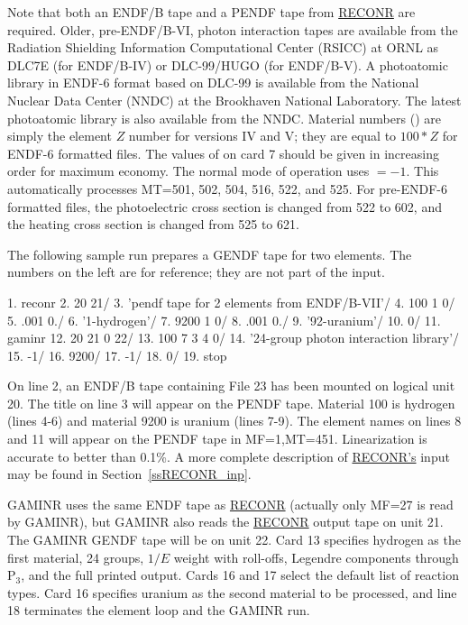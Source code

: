 Note that both an ENDF/B tape and a PENDF tape from
\hyperlink{sRECONRhy}{RECONR} are required.
Older, pre-ENDF/B-VI, photon interaction tapes are available from the Radiation
Shielding Information Computational Center (RSICC) at ORNL
as DLC7E (for ENDF/B-IV) or DLC-99/HUGO (for ENDF/B-V).
A photoatomic library in ENDF-6 format based on DLC-99 is available
from the National Nuclear Data Center (NNDC) at the Brookhaven National
Laboratory.  The latest photoatomic library is also available
from the NNDC.  Material numbers () are simply the element
$Z$ number for versions IV and V;  they are equal to $100{*}Z$ for
ENDF-6 formatted files.  The values of  on card 7 should
be given in increasing order for maximum economy.  The normal mode
of operation uses $=-1$.  This automatically processes
MT=501, 502, 504, 516, 522, and 525.  For pre-ENDF-6 formatted files,
the photoelectric cross section is changed from 522 to 602, and the
heating cross section is changed from 525 to 621.

The following sample run prepares a GENDF tape for two elements.
The numbers on the left are for reference; they are not part of the input.

\small
\begin{ccode}

  1.   reconr
  2.   20 21/
  3.   'pendf tape for 2 elements from ENDF/B-VII'/
  4.   100 1 0/
  5.   .001 0./
  6.   '1-hydrogen'/
  7.   9200 1 0/
  8.   .001 0./
  9.   '92-uranium'/
 10.   0/
 11.   gaminr
 12.   20 21 0 22/
 13.   100 7 3 4 0/
 14.   '24-group photon interaction library'/
 15.   -1/
 16.   9200/
 17.   -1/
 18.   0/
 19.   stop

\end{ccode}
\normalsize

On line 2, an ENDF/B tape containing File 23 has been
mounted on logical unit 20.  The title on line 3 will appear on the PENDF
tape.  Material 100 is hydrogen (lines 4-6) and material 9200 is uranium
(lines 7-9).  The element names on lines 8 and 11 will appear on the
PENDF tape in MF=1,MT=451.  Linearization is accurate to better
than 0.1\%.  A more complete description of
\hyperlink{sRECONRhy}{RECONR's} input may be found in
Section~\ref{ssRECONR_inp}.

GAMINR uses the same ENDF tape as \hyperlink{sRECONRhy}{RECONR}
(actually only MF=27 is read
by GAMINR), but GAMINR also reads the
\hyperlink{sRECONRhy}{RECONR} output tape on unit 21.
The GAMINR GENDF tape will be on unit 22.  Card 13 specifies hydrogen
as the first material, 24 groups, $1/E$ weight with roll-offs,
Legendre components through P$_3$, and the full printed output.  Cards 16
and 17 select the default list of reaction types.  Card 16 specifies
uranium as the second material to be processed, and line 18 terminates
the element loop and the GAMINR run.

